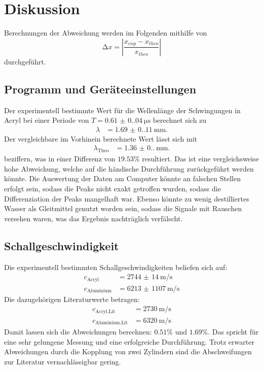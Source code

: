 \section{Diskussion}
\label{sec:Diskussion}

Berechnungen der Abweichung werden im Folgenden mithilfe von 
\begin{equation*}
    \increment x = \left| \frac{x_{exp}-x_{theo}}{x_{theo}} \right|
\end{equation*}
durchgeführt.

\subsection{Programm und Geräteeinstellungen}
Der experimentell bestimmte Wert für die Wellenlänge der Schwingungen in Acryl 
bei einer Periode von $T = \qty{0.61(0.04)}{\micro\second}$ berechnet sich zu
\begin{align*}
    \lambda &= \qty{1.69(0.11)}{\milli\meter}.
\end{align*}
Der vergleichbare im Vorhinein berechnete Wert lässt sich mit 
\begin{align*}
    \lambda_\text{Theo} &= \qty{1.36(0.0)}{\milli\meter}.
\end{align*}
beziffern, was in einer Differenz von $19.53 \%$ resultiert. Das ist eine 
vergleichsweise hohe Abweichung, welche auf die händische Durchführung zurückgeführt 
werden könnte. Die Auswertung der Daten am Computer könnte an falschen Stellen 
erfolgt sein, sodass die Peaks nicht exakt getroffen wurden, sodass die Differenziation 
der Peaks mangelhaft war. Ebenso könnte zu wenig destilliertes Wasser als 
Gleitmittel genutzt worden sein, sodass die Signale mit Rauschen versehen waren, 
was das Ergebnis nachträglich verfälscht.

\subsection{Schallgeschwindigkeit}
Die experimentell bestimmten Schallgeschwindigkeiten beliefen sich auf:
\begin{align*}
    c_\text{Acryl} &= \qty{2744(14)}{\meter\per\second} \\
    c_\text{Aluminium} &= \qty{6213(1107)}{\meter\per\second}
\end{align*}
Die dazugehörigen Literaturwerte betragen:
\begin{align*}
    c_\text{Acryl,Lit} &= \qty{2730}{\meter\per\second} \\
    c_\text{Aluminium,Lit} &= \qty{6320}{\meter\per\second}
\end{align*}
\noindent Damit lassen sich die Abweichungen berechnen: $0.51 \%$ und $1.69 \%$. 
Das spricht für eine sehr gelungene Messung und eine erfolgreiche Durchführung. 
Trotz erwarter Abweichungen durch die Kopplung von zwei Zylindern sind die 
Abschweifungen zur Literatur vernachlässigbar gering.

